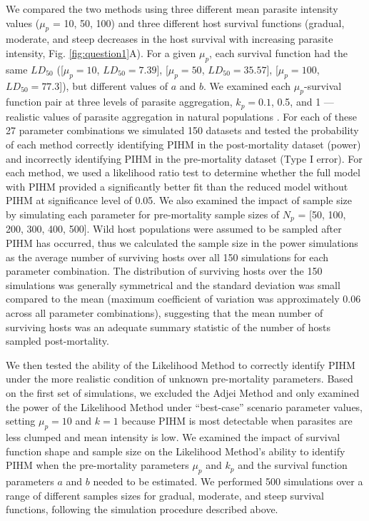\documentclass[12pt, a4paper]{article}
\begin{document}
We compared the two methods using three different mean parasite intensity values ($\mu_p$ = 10, 50, 100) and three different host survival functions (gradual, moderate, and steep decreases in the host survival with increasing parasite intensity, Fig. \ref{fig:question1}A). For a given $\mu_p$, each survival function had the same $LD_{50}$ ([$\mu_p = 10$, $LD_{50} = 7.39$], [$\mu_p = 50$, $LD_{50} = 35.57$], [$\mu_p = 100$, $LD_{50}= 77.3$]),  but different values of $a$ and $b$.  We examined each $\mu_p$-survival function pair at  three levels of parasite
aggregation, $k_p = 0.1$, 0.5, and 1 --- realistic values of parasite aggregation in natural populations \citep{Shaw1998}.  For each of these 27 parameter
combinations we simulated 150 datasets and tested the probability of each method correctly identifying PIHM in the post-mortality dataset (power) and incorrectly identifying PIHM in the pre-mortality dataset (Type I error).  For each method, we used a likelihood ratio test to determine whether the full model with PIHM provided a significantly better fit than the reduced model without PIHM at significance level of 0.05.  We also examined the impact of sample size by simulating each parameter for pre-mortality sample sizes of $N_p$ = [50, 100, 200, 300, 400, 500].  Wild host populations were assumed to be sampled after PIHM has occurred, thus we calculated the sample size in the power simulations as the average number of surviving hosts over all 150 simulations for each parameter combination. The distribution of surviving hosts over the 150 simulations was generally symmetrical and the standard deviation was small compared to the mean (maximum coefficient of variation was approximately 0.06 across all parameter combinations), suggesting that the mean number of surviving hosts was an adequate summary statistic of the number of hosts sampled post-mortality.

We then tested the ability of the Likelihood Method to correctly identify PIHM
under the more realistic condition of unknown pre-mortality parameters. Based
on the first set of simulations, we excluded the Adjei Method and only examined
the power of the Likelihood Method under ``best-case'' scenario parameter
values, setting $\mu_p = 10$ and $k = 1$ because PIHM is most detectable when
parasites are less clumped and mean intensity is low. We examined the impact of survival function shape and
sample size on the Likelihood Method's ability to identify PIHM when the pre-mortality parameters $\mu_p$ and $k_p$ and the survival function parameters $a$
and $b$ needed to be estimated.  We performed 500 simulations over a range of
different samples sizes for gradual, moderate, and steep survival functions, following the simulation procedure described above. \\
\end{document}

